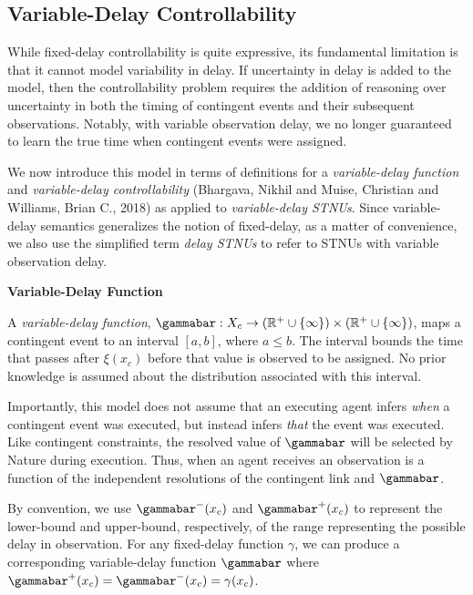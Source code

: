 \documentclass[11pt]{article}
\begin{document}
\subsection{Variable-Delay Controllability}
\label{sec:org153c956}
\label{sec:vdc}

While fixed-delay controllability is quite expressive, its fundamental limitation is that it cannot
model variability in delay. If uncertainty in delay is added to the model, then the controllability
problem requires the addition of reasoning over uncertainty in both the timing of contingent events
and their subsequent observations. Notably, with variable observation delay, we no longer guaranteed
to learn the true time when contingent events were assigned.

We now introduce this model in terms of definitions for a \emph{variable-delay function} and
\emph{variable-delay controllability} (Bhargava, Nikhil and Muise, Christian and Williams, Brian C., 2018) as applied to \emph{variable-delay STNUs}. Since
variable-delay semantics generalizes the notion of fixed-delay, as a matter of convenience, we also
use the simplified term \emph{delay STNUs} to refer to STNUs with variable observation delay.

\begin{defn}
\textbf{Variable-Delay Function}

A \emph{variable-delay function}, \(\gammabar: X_c \rightarrow (\mathbb{R}^+ \cup \{\infty\}) \times
(\mathbb{R}^+ \cup \{\infty\})\), maps a contingent event to an interval \([a, b]\), where \(a \leq b\).
The interval bounds the time that passes after \(\xi(x_{c})\) before that value is observed to be
assigned. No prior knowledge is assumed about the distribution associated with this interval.
\end{defn}

Importantly, this model does not assume that an executing agent infers \emph{when} a contingent event was
executed, but instead infers \emph{that} the event was executed. Like contingent constraints, the
resolved value of \(\gammabar\) will be selected by Nature during execution. Thus, when an agent
receives an observation is a function of the independent resolutions of the contingent link and
\(\gammabar\).

By convention, we use \(\gammabar^-(x_c)\) and \(\gammabar^+(x_c)\) to represent the lower-bound and
upper-bound, respectively, of the range representing the possible delay in observation. For any
fixed-delay function \(\gamma\), we can produce a corresponding variable-delay function \(\gammabar\)
where \(\gammabar^+(x_{c}) = \gammabar^-(x_{c}) = \gamma(x_c)\).
\end{document}
